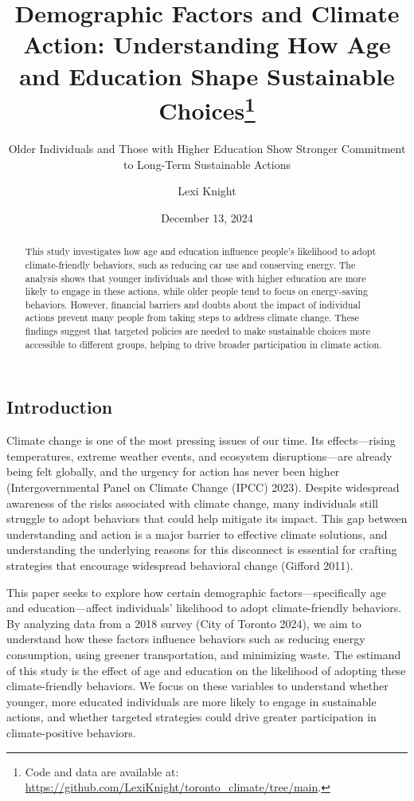 \documentclass[
  letterpaper,
  DIV=11,
  numbers=noendperiod]{scrartcl}
\title{Demographic Factors and Climate Action: Understanding How Age and
Education Shape Sustainable Choices\thanks{Code and data are available
at: \url{https://github.com/LexiKnight/toronto_climate/tree/main}.}}
\subtitle{Older Individuals and Those with Higher Education Show
Stronger Commitment to Long-Term Sustainable Actions}
\author{Lexi Knight}
\date{December 13, 2024}
\renewcommand*\contentsname{Table of contents}
\newcommand\contentsname{Table of contents}
\begin{document}
\maketitle
\begin{abstract}
This study investigates how age and education influence people's
likelihood to adopt climate-friendly behaviors, such as reducing car use
and conserving energy. The analysis shows that younger individuals and
those with higher education are more likely to engage in these actions,
while older people tend to focus on energy-saving behaviors. However,
financial barriers and doubts about the impact of individual actions
prevent many people from taking steps to address climate change. These
findings suggest that targeted policies are needed to make sustainable
choices more accessible to different groups, helping to drive broader
participation in climate action.
\end{abstract}

\renewcommand*\contentsname{Table of contents}
{
\hypersetup{linkcolor=}
\setcounter{tocdepth}{3}
\tableofcontents
}
\subsection{Introduction}\label{introduction}

Climate change is one of the most pressing issues of our time. Its
effects---rising temperatures, extreme weather events, and ecosystem
disruptions---are already being felt globally, and the urgency for
action has never been higher (Intergovernmental Panel on Climate Change
(IPCC) 2023). Despite widespread awareness of the risks associated with
climate change, many individuals still struggle to adopt behaviors that
could help mitigate its impact. This gap between understanding and
action is a major barrier to effective climate solutions, and
understanding the underlying reasons for this disconnect is essential
for crafting strategies that encourage widespread behavioral change
(Gifford 2011).

This paper seeks to explore how certain demographic
factors---specifically age and education---affect individuals'
likelihood to adopt climate-friendly behaviors. By analyzing data from a
2018 survey (City of Toronto 2024), we aim to understand how these
factors influence behaviors such as reducing energy consumption, using
greener transportation, and minimizing waste. The estimand of this study
is the effect of age and education on the likelihood of adopting these
climate-friendly behaviors. We focus on these variables to understand
whether younger, more educated individuals are more likely to engage in
sustainable actions, and whether targeted strategies could drive greater
participation in climate-positive behaviors.
\end{document}
